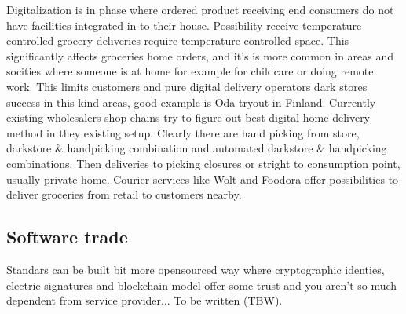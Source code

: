 Digitalization is in phase where ordered product receiving end consumers do not
have facilities integrated in to their house. Possibility receive temperature
controlled grocery deliveries require temperature controlled space. This
significantly affects groceries home orders, and it's is more common in areas
and socities where someone is at home for example for childcare or doing remote
work. This limits customers and pure digital delivery operators dark stores
success in this kind areas, good example is Oda\cite{Oda} tryout in Finland.
Currently existing wholesalers shop chains try to figure out best digital home
delivery method in they existing setup. Clearly there are hand picking from
store, darkstore \& handpicking combination and automated darkstore \&
handpicking combinations. Then deliveries to picking closures or stright to
consumption point, usually private home. Courier services like Wolt\cite{Wolt}
and Foodora\cite{Foodora} offer possibilities to deliver groceries from retail
to customers nearby.

\subsection{Software trade}
\label{software_trade}

Standars can be built bit more opensourced way where cryptographic identies,
electric signatures and blockchain model offer some trust and you aren't so
much dependent from service provider... To be written (TBW).



